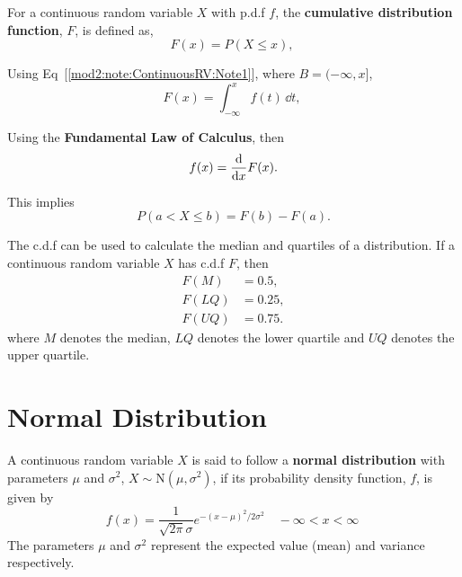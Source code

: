 \begin{defn} \label{mod2:defn:ContinuousRV:CDF}
	For a continuous random variable $X$ with p.d.f $f$,  the \textbf{cumulative distribution function}, $F$, is defined as,
	\begin{equation}
		F(x) = P(X \leq x), \
	\end{equation}
	
	Using Eq~[\ref{mod2:note:ContinuousRV:Note1}], where $B = (-\infty, x]$,
	\begin{equation}
		F(x) = \int_{-\infty}^{x} f(t)\,\dd t, \
	\end{equation}
	
	Using the \textbf{Fundamental Law of Calculus}, then
	\begin{equation}
	f(x) = \frac{\mathrm{d}}{\mathrm{d}x}F(x)
.	\end{equation}
	
	
\end{defn}	

\begin{note} \label{mod2:note:ContinuousRV:CDF}
	This implies
	\begin{equation}
		P( a < X \leq b) = F(b) - F(a).
	\end{equation}
\end{note}

\begin{prop} \label{mod2:prop:ContinuousRV:CDF}
	The c.d.f can be used to calculate the median and quartiles of a distribution. If a continuous random variable $X$ has c.d.f $F$,  then 
	\begin{align}
	F(M) &= 0.5, \\
	F(LQ) &= 0.25, \\
	F(UQ) &= 0.75.
	\end{align}	
	where $M$ denotes the median, $LQ$ denotes the lower quartile and $UQ$ denotes the upper quartile.
\end{prop}
		




\section{Normal Distribution}\label{mod2:section:Normal}

\begin{defn}\label{mod2:defn:Normal}
	A continuous random variable $X$ is said to follow a \textbf{normal distribution} with parameters $\mu$ and $\sigma^2$, $X \sim \text{N}(\mu,\sigma^2)$, if its probability density function, $f$, is given by
	\begin{equation}
	f(x) = \frac{1}{\sqrt{2 \pi}\sigma} e^{-(x-\mu)^2/2\sigma^2} \quad -\infty < x < \infty  \label{mod2:eq:Normal}\
	\end{equation}
	The parameters $\mu$ and $\sigma^2$ represent the expected value (mean) and variance respectively.
\end{defn}


